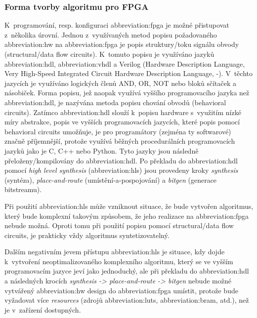 \documentclass[a4paper, twoside, 11pt]{article}
\begin{document}
		\subsubsection{Forma tvorby algoritmu pro FPGA}\label{subsubsec:forma-tvorby-algoritmu-pro-fpga}
		K~programování, resp. konfiguraci \gls{abbreviation:fpga} je možné přistupovat z~několika úrovní. Jednou z~využívaných metod popisu požadovaného \gls{abbreviation:hw} na \gls{abbreviation:fpga} je popis struktury/toku signálu obvody (structural/data flow circuits). K~tomuto popisu je využíváno jazyků \gls{abbreviation:hdl}, \gls{abbreviation:vhdl} a Verilog (Hardware Description Language, Very High-Speed Integrated Circuit Hardware Description Language, -). V~těchto jazycích je využíváno logických členů AND, OR, NOT nebo bloků sčítaček a násobiček. Forma popisu, jež naopak využívá vyššího programovacího jazyka než \gls{abbreviation:hdl}, je nazývána metoda popisu chování obvodů (behavioral circuits). Zatímco \gls{abbreviation:hdl} slouží k~popisu hardware s~využitím nízké míry abstrakce, popis ve vyšších programovacích jazycích, které popis pomocí behavioral circuits umožňuje, je pro programátory (zejména ty softwarové) značně příjemnější, protože využívá běžných procedurálních programovacích jazyků jako je C, C++ nebo Python. Tyto jazyky jsou následně přeloženy/kompilovány do \gls{abbreviation:hdl}. Po překladu do \gls{abbreviation:hdl} pomocí \textit{high level synthesis} (\gls{abbreviation:hls}) jsou provedeny kroky \textit{synthesis} (syntéza), \textit{place-and-route} (umístění-a-pospojování) a \textit{bitgen} (generace bitstreamu). \cite{Sass2010}\par
		Při použití \gls{abbreviation:hls} může vzniknout situace, že bude vytvořen algoritmus, který bude komplexní takovým způsobem, že jeho realizace na \gls{abbreviation:fpga} nebude možná. Oproti tomu při použití popisu pomocí structural/data flow circuits, je prakticky vždy algoritmus syntetizovatelný. \cite{Sass2010}\par
		Dalším negativním jevem přístupu \gls{abbreviation:hls} je situace, kdy dojde k~vytvoření neoptimalizovaného komplexního algoritmu, který se ve vyšším programovacím jazyce jeví jako jednoduchý, ale při překladu do \gls{abbreviation:hdl} a následných krocích \textit{synthesis -> place-and-route -> bitgen} nebude možné vytvářený \gls{abbreviation:hw} design do \gls{abbreviation:fpga} umístit, protože bude vyžadovat více \textit{resources} (zdrojů \gls{abbreviation:luts}, \gls{abbreviation:bram}, atd.), než je v~zařízení dostupných. \cite{Sass2010}\par
\end{document}
